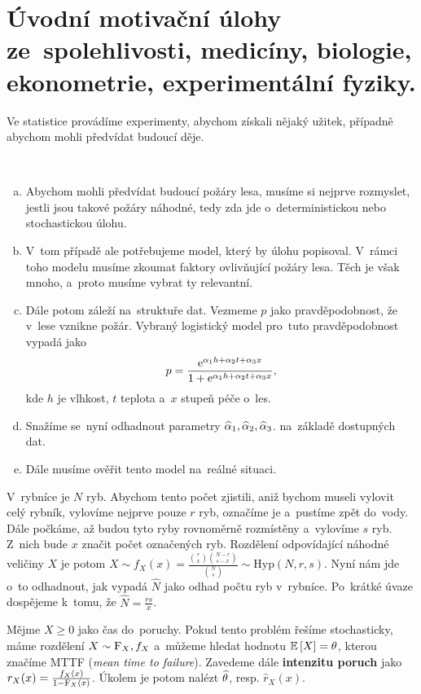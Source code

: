 \chapter{Úvodní motivační úlohy ze~spolehlivosti, medicíny, biologie, ekonometrie, experimentální fyziky.}
Ve statistice provádíme experimenty, abychom získali nějaký užitek, případně abychom mohli předvídat budoucí děje. 

\begin{example}~
	 \begin{enumerate}[a)]
		\item Abychom mohli předvídat budoucí požáry lesa, musíme si nejprve rozmyslet, jestli jsou takové požáry náhodné, tedy zda jde o~deterministickou nebo stochastickou úlohu. 
		\item V~tom případě ale potřebujeme model, který by úlohu popisoval. V~rámci toho modelu musíme zkoumat faktory ovlivňující požáry lesa. Těch je však mnoho, a~proto musíme vybrat ty relevantní. 
		\item Dále potom záleží na~struktuře dat. Vezmeme $p$ jako pravděpodobnost, že v~lese vznikne požár. Vybraný logistický model pro~tuto pravděpodobnost vypadá jako
		$$ p=\frac{\mathrm{e}^{\alpha_1 h+\alpha_2t+\alpha_3x}}{1+\mathrm{e}^{\alpha_1 h+\alpha_2 t+\alpha_3 x}}, $$
		kde $h$ je vlhkost, $t$ teplota a~$x$ stupeň péče o~les.
		\item Snažíme se~nyní odhadnout parametry $\widehat{\alpha}_1,\widehat{\alpha}_2,\widehat{\alpha}_3$. na~základě dostupných dat.
		\item Dále musíme ověřit tento model na~reálné situaci.
	\end{enumerate} 
\end{example}
\begin{example} V~rybníce je $N$ ryb. Abychom tento počet zjistili, aniž bychom museli vylovit celý rybník, vylovíme nejprve pouze $r$ ryb, označíme je a~pustíme zpět do~vody. Dále počkáme, až budou tyto ryby rovnoměrně rozmístěny a~vylovíme $s$ ryb. Z~nich bude $x$ značit počet označených ryb. Rozdělení odpovídající náhodné veličiny $X$ je potom $X\sim f_X(x)=\frac{\binom{r}{x}\binom{N-r}{s-x}}{\binom{N}{s}}\sim\mathrm{Hyp}(N,r,s)$. Nyní nám jde o~to odhadnout, jak vypadá $\widehat{N}$ jako odhad počtu ryb v~rybníce. Po~krátké úvaze dospějeme k~tomu, že $\widehat{N}=\frac{rs}{x}$.
\end{example}
\begin{example}
	Mějme $X\geq0$ jako čas do~poruchy. Pokud tento problém řešíme stochasticky, máme rozdělení $X\sim \mathrm{F}_X,f_X$ a~můžeme hledat hodnotu $\mathbb{E}\left[ X \right]=\theta$, kterou značíme MTTF (\textit{mean time to failure}). Zavedeme dále \textbf{intenzitu poruch} jako $r_X(x)=\frac{f_X(x)}{1-\mathrm{F}_X(x)}$. Úkolem je potom nalézt $\widehat{\theta}$, resp. $\widehat{r}_X(x)$.
\end{example}
